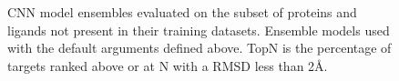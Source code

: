 \documentclass[linenumbers,doublespacing]{bmcart}
\begin{document}
\begin{figure}[tbh]
	\caption{CNN model ensembles evaluated on the subset of proteins and ligands not present in their training datasets. Ensemble models used with the default arguments defined above. TopN is the percentage of targets ranked above or at N with a RMSD less than 2{\AA}.}
	\label{fig:No2017NoCD20}
\end{figure}  
\end{document}
